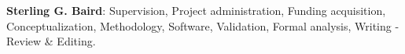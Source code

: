 \begin{section}
\textbf{Sterling G. Baird}: Supervision, Project administration, Funding acquisition, Conceptualization, Methodology, Software, Validation, Formal analysis, Writing - Review & Editing.
\end{section}